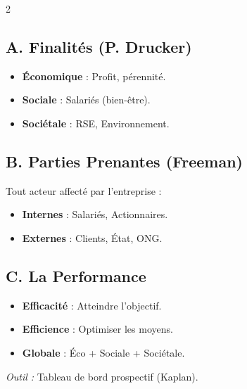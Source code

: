 \documentclass[a4paper,10pt]{article}
\newcommand{\notion}[1]{\textbf{\textcolor{mainBlue}{#1}}}
\newcommand{\definition}[1]{\textbf{\textcolor{softTeal}{#1}}}
\begin{document}
\begin{tcolorbox}[title=3. MANAGEMENT : Performance et RSE, colframe=alertRed]
    \begin{multicols}{2}
    
    \subsection*{A. Finalités (P. Drucker)}
    \begin{itemize}[leftmargin=*]
        \item \notion{Économique} : Profit, pérennité.
        \item \notion{Sociale} : Salariés (bien-être).
        \item \notion{Sociétale} : RSE, Environnement.
    \end{itemize}

    \subsection*{B. Parties Prenantes (Freeman)}
    Tout acteur affecté par l'entreprise :
    \begin{itemize}[leftmargin=*]
        \item \definition{Internes} : Salariés, Actionnaires.
        \item \definition{Externes} : Clients, État, ONG.
    \end{itemize}

    \columnbreak 

    \subsection*{C. La Performance}
    \begin{itemize}[leftmargin=*]
        \item \notion{Efficacité} : Atteindre l'objectif.
        \item \notion{Efficience} : Optimiser les moyens.
        \item \notion{Globale} : Éco + Sociale + Sociétale.
    \end{itemize}
    \textit{Outil :} Tableau de bord prospectif (Kaplan).
    \end{multicols}
\end{tcolorbox}
\end{document}

